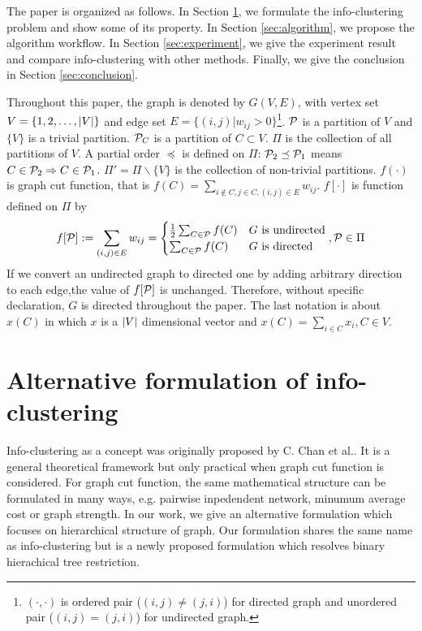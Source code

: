 \documentclass{article}
\begin{document}
The paper is organized as follows. In Section \ref{sec:models}, we formulate the info-clustering problem and show some of its property. In Section \ref{sec:algorithm}, we propose the algorithm workflow. In Section \ref{sec:experiment}, we give the experiment result and compare info-clustering with other methods. Finally, we give the conclusion in Section \ref{sec:conclusion}.

Throughout this paper, the graph is denoted by $G(V,E)$, with vertex set $V = \{1, 2, \dots, \abs{V}\}$ and edge set $E=\{(i,j) | w_{ij}>0\}$\footnote{$(\cdot, \cdot)$ is ordered pair ($(i,j) \neq (j,i)$) for directed graph and unordered pair ($(i,j) = (j,i)$) for undirected graph.}. $\P$ is a partition of $V$ and $\{V\}$ is a trivial partition. $\P_C$ is a partition of $C\subset V$. $\Pi$ is the collection of all partitions of $V$. A partial order $\preceq $ is defined on $\Pi$: $\P_2 \preceq \P_1$ means $C\in \P_2 \Rightarrow C \in \P_1$. $\Pi' = \Pi \backslash \{V\}$ is the collection of non-trivial partitions. $f(\cdot)$ is graph cut function, that is $f(C) = \sum_{i\not\in C, j\in C, (i,j) \in E} w_{ij}$. $f[\cdot]$ is function defined on $\Pi$ by
\begin{equation}
f[\P] := \sum_{(i,j)\in E} w_{ij} =
\begin{cases}
\frac{1}{2} \sum_{C\in \P}f(C)   & G \textrm{ is undirected} \\
\sum_{C\in \P}f(C)   & G \textrm{ is directed}
\end{cases},\P \in \Pi
\end{equation}
If we convert an undirected graph to directed one by adding arbitrary direction to each edge,the value of $f[\P]$ is unchanged. Therefore, without specific declaration, $G$ is directed throughout the paper. The last notation is about $x(C)$ in which $x$ is a $\abs{V}$ dimensional vector and $x(C)=\sum_{i \in C} x_i, C\in V$.
\section{Alternative formulation of info-clustering}\label{sec:models}
Info-clustering as a concept was originally proposed by C. Chan et al.\cite{RN1}. It is a general theoretical framework but only practical when graph cut function is considered. For graph cut function, the same mathematical structure can be formulated in many ways, e.g. pairwise inpedendent network\cite{RN9}, minumum average cost\cite{RN7} or graph strength\cite{RN12}. In our work, we give an alternative formulation which focuses on hierarchical structure of graph. Our formulation shares the same name as info-clustering but is a newly proposed formulation which resolves binary hierachical tree restriction.
\end{document}
